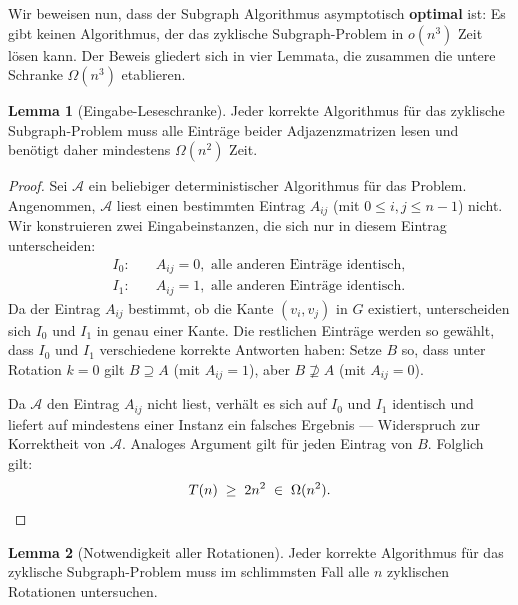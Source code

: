 \documentclass[a4paper,12pt]{article}
\theoremstyle{definition}
\newtheorem{lemma}{Lemma}
\begin{document}
Wir beweisen nun, dass der Subgraph Algorithmus asymptotisch \textbf{optimal} ist:
Es gibt keinen Algorithmus, der das zyklische Subgraph-Problem in $o(n^3)$ Zeit lösen kann.
Der Beweis gliedert sich in vier Lemmata, die zusammen die untere Schranke $\Omega(n^3)$ etablieren.

\begin{lemma}[Eingabe-Leseschranke]
\label{lem:eingabe}
Jeder korrekte Algorithmus für das zyklische Subgraph-Problem muss alle Einträge beider Adjazenzmatrizen lesen und benötigt daher mindestens $\Omega(n^2)$ Zeit.
\end{lemma}

\begin{proof}
Sei $\mathcal{A}$ ein beliebiger deterministischer Algorithmus für das Problem.
Angenommen, $\mathcal{A}$ liest einen bestimmten Eintrag $A_{ij}$ (mit $0 \le i, j \le n-1$) nicht.
Wir konstruieren zwei Eingabeinstanzen, die sich nur in diesem Eintrag unterscheiden:
\begin{align*}
	I_0: &\quad A_{ij} = 0, \text{ alle anderen Einträge identisch}, \\
	I_1: &\quad A_{ij} = 1, \text{ alle anderen Einträge identisch.}
\end{align*}
Da der Eintrag $A_{ij}$ bestimmt, ob die Kante $(v_i, v_j)$ in $G$ existiert, unterscheiden sich $I_0$ und $I_1$ in genau einer Kante.
Die restlichen Einträge werden so gewählt, dass $I_0$ und $I_1$ verschiedene korrekte Antworten haben:
Setze $B$ so, dass unter Rotation $k = 0$ gilt $B \supseteq A$ (mit $A_{ij} = 1$), aber $B \not\supseteq A$ (mit $A_{ij} = 0$).

Da $\mathcal{A}$ den Eintrag $A_{ij}$ nicht liest, verhält es sich auf $I_0$ und $I_1$ identisch und liefert auf mindestens einer Instanz ein falsches Ergebnis — Widerspruch zur Korrektheit von $\mathcal{A}$.
Analoges Argument gilt für jeden Eintrag von $B$.
Folglich gilt:
\[
	T(n) \;\geq\; 2n^2 \;\in\; \Omega(n^2). \qedhere
\]
\end{proof}

\begin{lemma}[Notwendigkeit aller Rotationen]
\label{lem:rotationen}
Jeder korrekte Algorithmus für das zyklische Subgraph-Problem muss im schlimmsten Fall alle $n$ zyklischen Rotationen untersuchen.
\end{lemma}
\end{document}
